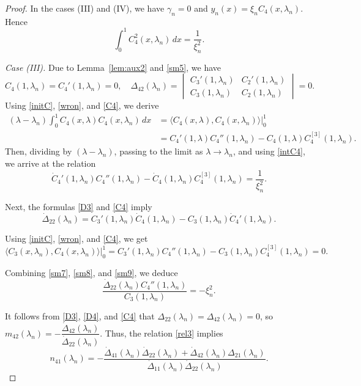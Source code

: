\documentclass[a4paper,12pt]{article}
\newcommand{\ga}{\gamma}
\newcommand{\la}{\lambda}
\theoremstyle{plain}
\numberwithin{equation}{section}
\theoremstyle{definition}
\theoremstyle{remark}
\begin{document}
\begin{proof}
In the cases (III) and (IV), we have $\ga_n = 0$ and $y_n(x) = \xi_n C_4(x, \la_n)$. Hence
\begin{equation} \label{intC4}
\int_0^1 C_4^2(x, \la_n) \, dx = \frac{1}{\xi_n^2}.
\end{equation}

\textit{Case (III).} Due to Lemma~\ref{lem:aux2} and \eqref{sm5}, we have
\begin{equation} \label{C4}
C_4(1, \la_n) = C_4'(1, \la_n) = 0, \quad 
\Delta_{42}(\la_n) = \begin{vmatrix}
C_3'(1, \la_n) & C_2'(1, \la_n) \\ C_3(1, \la_n) & C_2(1, \la_n)
\end{vmatrix} = 0.
\end{equation}
Using \eqref{initC}, \eqref{wron}, and \eqref{C4}, we derive
\begin{align*}
(\la - \la_n) \int_0^1 C_4(x, \la) C_4(x, \la_n) \, dx & = \langle C_4(x, \la), C_4(x, \la_n) \rangle \big|_0^1 \\ & = C_4'(1, \la) C_4''(1, \la_n) - C_4(1, \la) C_4^{[3]}(1, \la_n).
\end{align*}
Then, dividing by $(\la - \la_n)$, passing to the limit as $\la \to \la_n$, and using \eqref{intC4}, we arrive at the relation
\begin{equation} \label{sm7}
\dot C_4'(1, \la_n) C_4''(1, \la_n) - \dot C_4(1, \la_n) C_4^{[3]}(1, \la_n) = \frac{1}{\xi_n^2}.
\end{equation}

Next, the formulas \eqref{D3} and \eqref{C4} imply
\begin{equation} \label{sm8}
\dot\Delta_{22}(\la_n) = C_3'(1, \la_n) \dot C_4(1, \la_n) - C_3(1, \la_n) \dot C_4'(1, \la_n).
\end{equation}

Using \eqref{initC}, \eqref{wron}, and \eqref{C4}, we get
\begin{equation} \label{sm9}
\langle C_3(x, \la_n), C_4(x, \la_n) \rangle\big|_0^1 = C_3'(1, \la_n) C_4''(1, \la_n) - C_3(1, \la_n) C_4^{[3]}(1, \la_n) = 0.
\end{equation}

Combining \eqref{sm7}, \eqref{sm8}, and \eqref{sm9}, we deduce
\begin{equation} \label{C4pp}
\frac{\dot\Delta_{22}(\la_n) C_4''(1, \la_n)}{C_3(1, \la_n)} = -\xi_n^2.
\end{equation}

It follows from \eqref{D3}, \eqref{D4}, and \eqref{C4} that $\Delta_{22}(\la_n) = \Delta_{42}(\la_n) = 0$, so $m_{42}(\la_n) = -\dfrac{\dot \Delta_{42}(\la_n)}{\dot \Delta_{22}(\la_n)}$.
Thus, the relation \eqref{rel3} implies
\begin{equation} \label{smn41}
n_{41}(\la_n) =  -\frac{\dot\Delta_{41}(\la_n) \dot \Delta_{22}(\la_n) + \dot \Delta_{42}(\la_n) \Delta_{21}(\la_n)}{\dot\Delta_{11}(\la_n) \dot \Delta_{22}(\la_n)}.
\end{equation}


\end{proof}
\end{document}
